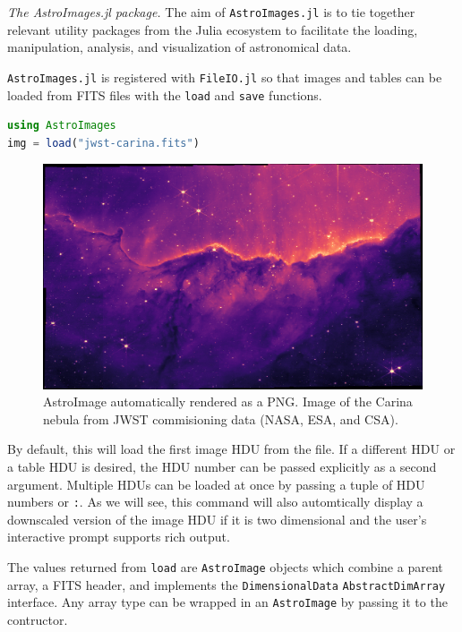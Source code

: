 \documentclass{juliacon}
\begin{document}
\clearpage
\emph{The AstroImages.jl package.}
The aim of \verb|AstroImages.jl| is to tie together relevant utility packages from the Julia ecosystem to facilitate the loading, manipulation, analysis, and visualization of astronomical data.

\verb|AstroImages.jl| is registered with \verb|FileIO.jl| so that images and tables can be loaded from FITS files with the \verb|load| and \verb|save| functions.
\begin{lstlisting}[language = Julia]
using AstroImages
img = load("jwst-carina.fits")
\end{lstlisting}

\vspace{-0.4cm}
\begin{figure}[hbt!]
\centerline{\includegraphics[width=\columnwidth]{carina.png}}
\caption{AstroImage automatically rendered as a PNG. Image of the Carina nebula from JWST commisioning data (NASA, ESA, and CSA).}
  \label{fig:jwst-carina}
\end{figure}
\FloatBarrier 

By default, this will load the first image HDU from the file. If a different HDU or a table HDU is desired, the HDU number can be passed explicitly as a second argument.
Multiple HDUs can be loaded at once by passing a tuple of HDU numbers or \verb|:|. As we will see, this command will also automtically display a downscaled version of the image HDU if it is two dimensional and the user's interactive prompt supports rich output.

The values returned from \verb|load| are \verb|AstroImage| objects which combine a parent array, a FITS header, and implements the \verb|DimensionalData| \verb|AbstractDimArray| interface.
Any array type can be wrapped in an \verb|AstroImage| by passing it to the contructor.
\end{document}
